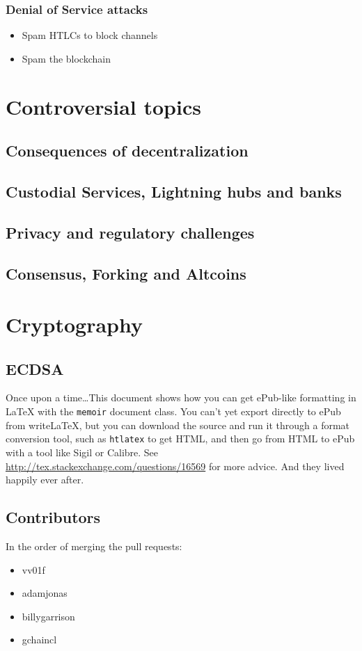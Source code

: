 \documentclass[a4paper,12pt,oneside,openany]{book}
\begin{document}
\subsection{Denial of Service attacks}
\begin{itemize}
\item Spam HTLCs to block channels
\item Spam the blockchain
\end{itemize}
\chapter{Controversial topics}
\section{Consequences of decentralization}
\section{Custodial Services, Lightning hubs and banks}
\section{Privacy and regulatory challenges}
\section{Consensus, Forking and Altcoins}


\appendix
\chapter{Cryptography}
\section{ECDSA}

Once upon a time\ldots This document shows how you can get ePub-like formatting in \LaTeX{} with the \verb|memoir| document class. You can't yet export directly to ePub from writeLaTeX, but you can download the source and run it through a format conversion tool, such as \verb|htlatex| to get HTML, and then go from HTML to ePub with a tool like Sigil or Calibre. See \url{http://tex.stackexchange.com/questions/16569} for more advice. And they lived happily ever after.

\appendix
\section{Contributors}
In the order of merging the pull requests:
\begin{itemize}
\item vv01f
\item adamjonas
\item billygarrison
\item gchaincl
\end{itemize}
\end{document}
